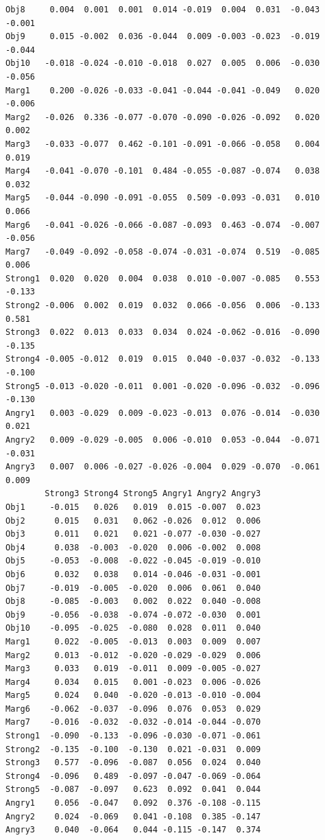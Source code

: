 \documentclass[
  english,
]{book}
\begin{document}
\begin{verbatim}
Obj8     0.004  0.001  0.001  0.014 -0.019  0.004  0.031  -0.043  -0.001
Obj9     0.015 -0.002  0.036 -0.044  0.009 -0.003 -0.023  -0.019  -0.044
Obj10   -0.018 -0.024 -0.010 -0.018  0.027  0.005  0.006  -0.030  -0.056
Marg1    0.200 -0.026 -0.033 -0.041 -0.044 -0.041 -0.049   0.020  -0.006
Marg2   -0.026  0.336 -0.077 -0.070 -0.090 -0.026 -0.092   0.020   0.002
Marg3   -0.033 -0.077  0.462 -0.101 -0.091 -0.066 -0.058   0.004   0.019
Marg4   -0.041 -0.070 -0.101  0.484 -0.055 -0.087 -0.074   0.038   0.032
Marg5   -0.044 -0.090 -0.091 -0.055  0.509 -0.093 -0.031   0.010   0.066
Marg6   -0.041 -0.026 -0.066 -0.087 -0.093  0.463 -0.074  -0.007  -0.056
Marg7   -0.049 -0.092 -0.058 -0.074 -0.031 -0.074  0.519  -0.085   0.006
Strong1  0.020  0.020  0.004  0.038  0.010 -0.007 -0.085   0.553  -0.133
Strong2 -0.006  0.002  0.019  0.032  0.066 -0.056  0.006  -0.133   0.581
Strong3  0.022  0.013  0.033  0.034  0.024 -0.062 -0.016  -0.090  -0.135
Strong4 -0.005 -0.012  0.019  0.015  0.040 -0.037 -0.032  -0.133  -0.100
Strong5 -0.013 -0.020 -0.011  0.001 -0.020 -0.096 -0.032  -0.096  -0.130
Angry1   0.003 -0.029  0.009 -0.023 -0.013  0.076 -0.014  -0.030   0.021
Angry2   0.009 -0.029 -0.005  0.006 -0.010  0.053 -0.044  -0.071  -0.031
Angry3   0.007  0.006 -0.027 -0.026 -0.004  0.029 -0.070  -0.061   0.009
        Strong3 Strong4 Strong5 Angry1 Angry2 Angry3
Obj1     -0.015   0.026   0.019  0.015 -0.007  0.023
Obj2      0.015   0.031   0.062 -0.026  0.012  0.006
Obj3      0.011   0.021   0.021 -0.077 -0.030 -0.027
Obj4      0.038  -0.003  -0.020  0.006 -0.002  0.008
Obj5     -0.053  -0.008  -0.022 -0.045 -0.019 -0.010
Obj6      0.032   0.038   0.014 -0.046 -0.031 -0.001
Obj7     -0.019  -0.005  -0.020  0.006  0.061  0.040
Obj8     -0.085  -0.003   0.002  0.022  0.040 -0.008
Obj9     -0.056  -0.038  -0.074 -0.072 -0.030  0.001
Obj10    -0.095  -0.025  -0.080  0.028  0.011  0.040
Marg1     0.022  -0.005  -0.013  0.003  0.009  0.007
Marg2     0.013  -0.012  -0.020 -0.029 -0.029  0.006
Marg3     0.033   0.019  -0.011  0.009 -0.005 -0.027
Marg4     0.034   0.015   0.001 -0.023  0.006 -0.026
Marg5     0.024   0.040  -0.020 -0.013 -0.010 -0.004
Marg6    -0.062  -0.037  -0.096  0.076  0.053  0.029
Marg7    -0.016  -0.032  -0.032 -0.014 -0.044 -0.070
Strong1  -0.090  -0.133  -0.096 -0.030 -0.071 -0.061
Strong2  -0.135  -0.100  -0.130  0.021 -0.031  0.009
Strong3   0.577  -0.096  -0.087  0.056  0.024  0.040
Strong4  -0.096   0.489  -0.097 -0.047 -0.069 -0.064
Strong5  -0.087  -0.097   0.623  0.092  0.041  0.044
Angry1    0.056  -0.047   0.092  0.376 -0.108 -0.115
Angry2    0.024  -0.069   0.041 -0.108  0.385 -0.147
Angry3    0.040  -0.064   0.044 -0.115 -0.147  0.374
\end{verbatim}
\end{document}
